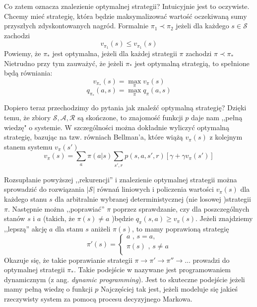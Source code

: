 \documentclass[licencjacka]{pracamgr}
\begin{document}
Co zatem oznacza znalezienie optymalnej strategii? Intuicyjnie jest to oczywiste. Chcemy mieć strategię, która będzie maksymalizować wartość oczekiwaną sumy przyszłych zdyskontowanych nagród. Formalnie $\pi_{1}\prec\pi_{2}$ jeżeli dla każdego $s\in\mathcal{S}$ zachodzi $$v_{\pi_{1}}(s)\leq v_{\pi_{1}}(s)$$
Powiemy, że $\pi_{*}$ jest optymalna, jeżeli dla każdej strategii $\pi$ zachodzi   $\pi\prec\pi_{*}$ Nietrudno przy tym zauważyć, że jeżeli $\pi_{*}$ jest optymalną strategią, to spełnione będą równiania:
$$v_{\pi_{*}}(s) =\max_{\pi} v_{\pi}(s)$$ $$q_{\pi_{*}}(a,s) = \max_{\pi} q_{\pi}(a,s)$$

Dopiero teraz przechodzimy do pytania jak znaleźć optymalną strategię? Dzięki temu, że zbiory $\mathcal{S}, \mathcal{A}, \mathcal{R}$ są skończone, to znajomość funkcji $p$ daje nam  ,,pełną wiedzę" o systemie. W szczególności można dokładnie wyliczyć optymalną strategię, bazując na tzw. równiach Bellman'a, które wiążą $v_{\pi}(s)$ z kolejnym stanem systemu $v_{\pi}(s')$
$$v_{\pi}(s) = \sum_{a}\pi(a|s)\sum_{s',r}p(s,a,s',r)[\gamma +\gamma v_{\pi}(s')] $$

Rozsupłanie powyższej ,,rekurencji'' i znalezienie optymalnej strategii  można  sprowadzić  do rozwiązania $|\mathcal{S}|$  równań liniowych i policzenia wartości $v_{\pi}(s)$  dla każdego stanu $s$ dla arbitralnie wybranej deterministycznej (nie losowej )strategii $\pi$. Następnie można ,,poprawiać'' $\pi$ poprzez sprawdzanie, czy dla poszczególnych stanów $s$ i $a$ (takich, że $\pi(s)\neq a$ )będzie $q_{\pi}(s,a)\geq v_{\pi}(s)$. Jeżeli znajdziemy ,,lepszą'' akcję $a$  dla stanu $s$ aniżeli $\pi(s)$, to mamy poprawioną strategię 
$$\pi'(s) =
	\begin{cases}
		a\text{ ,  }s=a,\\			
		\pi(s)\text{ , } s\neq a\\
	\end{cases}
$$
 Okazuje się, że takie poprawianie strategii $\pi\rightarrow\pi'\rightarrow\pi''\rightarrow ...$ prowadzi do optymalnej strategii $\pi_{*}$. Takie podejście w \cite{RL} nazywane jest programowaniem dynamicznym (z ang. \textit{dynamic programming}). Jest to skuteczne podejście jeżeli mamy pełną wiedzę o funkcji $p$ Najczęściej tak jest, jeżeli modeluje się jakieś rzeczywisty system za pomocą procesu decyzyjnego Markowa.\\
\end{document}

